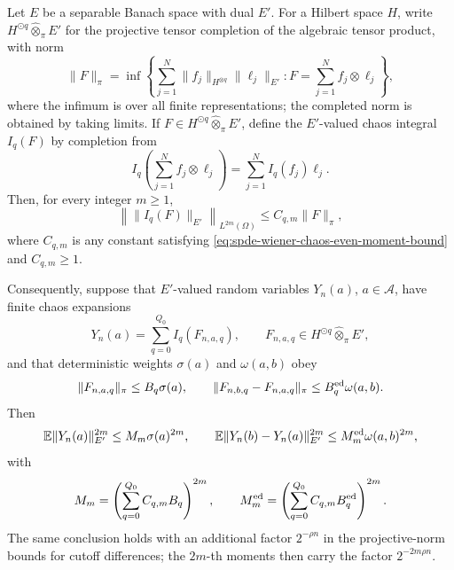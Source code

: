 \begin{proposition}
\label{prop:spde-dual-norm-finite-chaos-estimate}
Let \(E\) be a separable Banach space with dual \(E'\).  For a Hilbert space
\(H\), write \(H^{\odot q}\widehat\otimes_\pi E'\) for the projective tensor
completion of the algebraic tensor product, with norm
\[
  \|F\|_{\pi}
  =
  \inf
  \left\{
    \sum_{j=1}^N\|f_j\|_{H^{\otimes q}}\|\ell_j\|_{E'}:
    F=\sum_{j=1}^N f_j\otimes \ell_j
  \right\},
\]
where the infimum is over all finite representations; the completed norm is
obtained by taking limits.  If \(F\in H^{\odot q}\widehat\otimes_\pi E'\),
define the \(E'\)-valued chaos integral \(I_q(F)\) by completion from
\[
  I_q\!\left(\sum_{j=1}^N f_j\otimes \ell_j\right)
  =
  \sum_{j=1}^N I_q(f_j)\ell_j .
\]
Then, for every integer \(m\geq1\),
\begin{equation}
  \left\|\|I_q(F)\|_{E'}\right\|_{L^{2m}(\Omega)}
  \leq
  C_{q,m}\|F\|_\pi ,
  \label{eq:spde-dual-chaos-single-bound}
\end{equation}
where \(C_{q,m}\) is any constant satisfying
\eqref{eq:spde-wiener-chaos-even-moment-bound} and \(C_{q,m}\geq1\).

Consequently, suppose that \(E'\)-valued random variables \(Y_n(a)\),
\(a\in\mathcal A\), have finite chaos expansions
\[
  Y_n(a)=\sum_{q=0}^{Q_0}I_q(F_{n,a,q}),
  \qquad
  F_{n,a,q}\in H^{\odot q}\widehat\otimes_\pi E',
\]
and that deterministic weights \(\sigma(a)\) and \(\omega(a,b)\) obey
\[
  \|F_{n,a,q}\|_\pi\leq B_q\sigma(a),
  \qquad
  \|F_{n,b,q}-F_{n,a,q}\|_\pi\leq B_q^{\rm ed}\omega(a,b).
\]
Then
\[
  \mathbb E\|Y_n(a)\|_{E'}^{2m}
  \leq
  M_m\sigma(a)^{2m},
  \qquad
  \mathbb E\|Y_n(b)-Y_n(a)\|_{E'}^{2m}
  \leq
  M_m^{\rm ed}\omega(a,b)^{2m},
\]
with
\[
  M_m=
  \left(\sum_{q=0}^{Q_0}C_{q,m}B_q\right)^{2m},
  \qquad
  M_m^{\rm ed}=
  \left(\sum_{q=0}^{Q_0}C_{q,m}B_q^{\rm ed}\right)^{2m}.
\]
The same conclusion holds with an additional factor \(2^{-\rho n}\) in the
projective-norm bounds for cutoff differences; the \(2m\)-th moments then
carry the factor \(2^{-2m\rho n}\).
\end{proposition}

